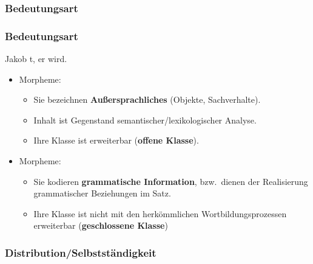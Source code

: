 \subsubsection{Bedeutungsart}


\begin{frame}
\frametitle{Bedeutungsart}


\ea Jakob t,  er    wird.
\z

\begin{itemize}
	\item {} Morpheme:
	\begin{itemize}
		\item Sie bezeichnen \textbf{Außersprachliches} (Objekte, Sachverhalte). 
		
		\item Inhalt ist Gegenstand semantischer/lexikologischer Analyse.
		
		\item Ihre Klasse ist erweiterbar (\textbf{offene Klasse}).
	
	\end{itemize}

\pause 
		
	\item {} Morpheme:
	
	\begin{itemize}
		\item Sie kodieren \textbf{grammatische Information}, bzw.\ dienen der Realisierung grammatischer Beziehungen im Satz.
		
		\item Ihre Klasse ist nicht mit den herkömmlichen Wortbildungsprozessen erweiterbar (\textbf{geschlossene Klasse})
	
	\end{itemize}
\end{itemize}

\end{frame}


\subsubsection{Distribution/Selbstständigkeit}



